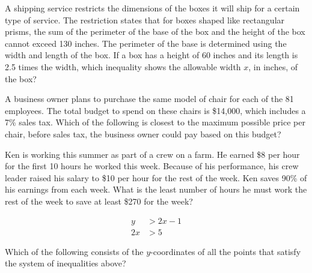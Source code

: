 A shipping service restricts the dimensions of the boxes it will ship for a certain type of service. The restriction states that for boxes shaped like rectangular prisms, the sum of the perimeter of the base of the box and the height of the box cannot exceed 130 inches. The perimeter of the base is determined using the width and length of the box. If a box has a height of 60 inches and its length is 2.5 times the width, which inequality shows the allowable width \( x \), in inches, of the box?

\vspace{0.75em}


\vspace{2em}

\noindent\markforreview

\vspace{1em}

A business owner plans to purchase the same model of chair for each of the 81 employees. The total budget to spend on these chairs is \$14,000, which includes a 7\% sales tax. Which of the following is closest to the maximum possible price per chair, before sales tax, the business owner could pay based on this budget?

\vspace{0.75em}


\newpage


\noindent\markforreview

\vspace{1em}

Ken is working this summer as part of a crew on a farm. He earned \$8 per hour for the first 10 hours he worked this week. Because of his performance, his crew leader raised his salary to \$10 per hour for the rest of the week. Ken saves 90\% of his earnings from each week. What is the least number of hours he must work the rest of the week to save at least \$270 for the week?

\vspace{0.75em}


\newpage
\noindent\markforreview


\[
\begin{aligned}
y &> 2x - 1 \\
2x &> 5
\end{aligned}
\]

Which of the following consists of the \( y \)-coordinates of all the points that satisfy the system of inequalities above?

\vspace{0.75em}







